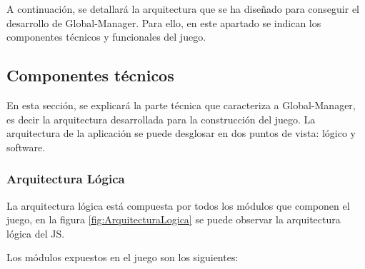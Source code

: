 A continuación, se detallará la arquitectura que se ha diseñado para conseguir el desarrollo de Global-Manager. Para ello, en este apartado se indican los componentes técnicos y funcionales del juego.

\subsection{Componentes técnicos}
\label{sec:ComponentesTecnicos}

En esta sección, se explicará la parte técnica que caracteriza a Global-Manager, es decir la arquitectura desarrollada para la construcción del juego. La arquitectura de la aplicación se puede desglosar en dos puntos de vista: lógico y software.

\subsubsection*{Arquitectura Lógica}

La arquitectura lógica está compuesta por todos los módulos que componen el juego, en la figura \ref{fig:ArquitecturaLogica} se puede observar la arquitectura lógica del JS.


Los módulos expuestos en el juego son los siguientes:

